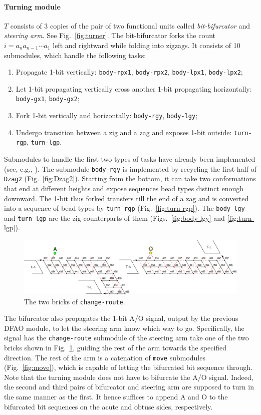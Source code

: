 \documentclass[dvipdfmx,review]{elsarticle}
\begin{document}
\paragraph{Turning module} $T$ consists of 3 copies of the pair of two functional units called \textit{bit-bifurcator} and \textit{steering arm}. 
See Fig.~\ref{fig:turner}. 
The bit-bifurcator forks the count $i = a_n a_{n-1} \cdots a_1$ left and rightward while folding into zigzags. 
It consists of 10 submodules, which handle the following tasks: 
\begin{enumerate}[1]
\item Propagate 1-bit vertically: {\tt body-rpx1}, {\tt body-rpx2}, {\tt body-lpx1}, {\tt body-lpx2}; 
\item Let 1-bit propagating vertically cross another 1-bit propagating horizontally: {\tt body-gx1}, {\tt body-gx2}; 
\item Fork 1-bit vertically and horizontally: {\tt body-rgy}, {\tt body-lgy}; 
\item Undergo transition between a zig and a zag and exposes 1-bit outside: {\tt turn-rgp}, {\tt turn-lgp}. 
\end{enumerate}
Submodules to handle the first two types of tasks have already been implemented (see, e.g., \cite{HaKiOtSe2016}). 
The submodule \texttt{body-rgy} is implemented by recycling the first half of \texttt{Dzag2} (Fig.~\ref{fig:Dzag2}). 
Starting from the bottom, it can take two conformations that end at different heights and expose sequences bead types distinct enough downward. 
The 1-bit thus forked transfers till the end of a zag and is converted into a sequence of bead types by \texttt{turn-rgp} (Fig.~\ref{fig:turn-rgp}). 
The \texttt{body-lgy} and \texttt{turn-lgp} are the zig-counterparts of them (Figs.~\ref{fig:body-lgy} and \ref{fig:turn-lgp}). 

\begin{figure}[tb]
\centering
\includegraphics[width=0.9\linewidth]{Figs/change-route.png}
\caption{The two bricks of \texttt{change-route}.}
\label{fig:change_route}
\end{figure}

The bifurcator also propagates the 1-bit A/O signal, output by the previous DFAO module, to let the steering arm know which way to go. 
Specifically, the signal has the \texttt{change-route} submodule of the steering arm take one of the two bricks shown in Fig.~\ref{fig:change_route}, guiding the rest of the arm towards the specified direction. 
The rest of the arm is a catenation of \texttt{move} submodules (Fig.~\ref{fig:move}), which is capable of letting the bifurcated bit sequence through. 
Note that the turning module does not have to bifurcate the A/O signal. 
Indeed, the second and third pairs of bifurcator and steering arm are supposed to turn in the same manner as the first. 
It hence suffices to append A and O to the bifurcated bit sequences on the acute and obtuse sides, respectively. 
\end{document}
